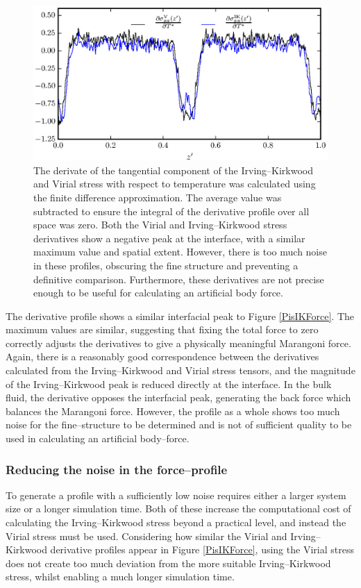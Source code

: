\begin{figure}[h!]
\centering
\includegraphics[scale=1.0]{Period10Force}
\caption{The derivate of the tangential component of the Irving--Kirkwood and Virial stress with respect to temperature was calculated using the finite difference approximation.
The average value was subtracted to ensure the integral of the derivative profile over all space was zero.
Both the Virial and Irving--Kirkwood stress derivatives show a negative peak at the interface, with a similar maximum value and spatial extent.
However, there is too much noise in these profiles, obscuring the fine structure and preventing a definitive comparison.
Furthermore, these derivatives are not precise enough to be useful for calculating an artificial body force.
}
\label{Period10Force}
\end{figure}
The derivative profile shows a similar interfacial peak to Figure \ref{PisIKForce}. 
The maximum values are similar, suggesting that fixing the total force to zero correctly adjusts the derivatives to give a physically meaningful Marangoni force.
Again, there is a reasonably good correspondence between the derivatives calculated from the Irving--Kirkwood and Virial stress tensors, and the magnitude of the Irving--Kirkwood peak is reduced directly at the interface.
In the bulk fluid, the derivative opposes the interfacial peak, generating the back force which balances the Marangoni force.
However, the profile as a whole shows too much noise for the fine--structure to be determined and is not of sufficient quality to be used in calculating an artificial body--force.

\subsubsection{Reducing the noise in the force--profile}
To generate a profile with a sufficiently low noise requires either a larger system size or a longer simulation time.
Both of these increase the computational cost of calculating the Irving--Kirkwood stress beyond a practical level, and instead the Virial stress must be used.
Considering how similar the Virial and Irving--Kirkwood derivative profiles appear in Figure \ref{PisIKForce}, using the Virial stress does not create too much deviation from the more suitable Irving--Kirkwood stress, whilst enabling a much longer simulation time.
\FloatBarrier

